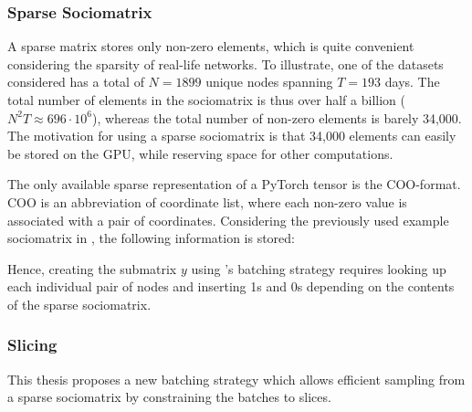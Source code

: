     \subsubsection{Sparse Sociomatrix}
    
        A sparse matrix stores only non-zero elements, which is quite convenient considering the sparsity of real-life networks. To illustrate, one of the datasets considered has a total of $N=1899$ unique nodes spanning $T=193$ days. The total number of elements in the sociomatrix is thus over half a billion ($N^2T \approx 696\cdot 10^6$), whereas the total number of non-zero elements is barely 34,000. The motivation for using a sparse sociomatrix is that 34,000 elements can easily be stored on the GPU, while reserving space for other computations.
        
        The only available sparse representation of a PyTorch tensor is the COO-format. COO is an abbreviation of coordinate list, where each non-zero value is associated with a pair of coordinates. Considering the previously used example sociomatrix in , the following information is stored:
        
        Hence, creating the submatrix $y$ using \citeauthor{jacobsen2018a}'s batching strategy requires looking up each individual pair of nodes and inserting 1s and 0s depending on the contents of the sparse sociomatrix.
    
    \subsubsection{Slicing}
    
        This thesis proposes a new batching strategy which allows efficient sampling from a sparse sociomatrix by constraining the batches to slices. 
        
        


        
